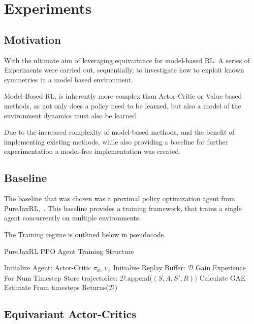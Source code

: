\chapter{Experiments}
\section{Motivation}
With the ultimate aim of leveraging equivariance for model-based RL. A series of Experiments were carried out, sequentially, to investigate how to exploit known symmetries in a model based environment.

Model-Based RL, is inherently more complex than Actor-Critic or Value based methods, as not only does a policy need to be learned, but also a model of the environment dynamics must also be learned.

Due to the increased complexity of model-based methods, and the benefit of implementing existing methods, while also providing a baseline for further experimentation a model-free implementation was created.

\section{Baseline}
The baseline that was chosen was a proximal policy optimization agent from PureJaxRL,~\cite{lu2022discovered}. This baseline provides a training framework, that trains a single agent concurrently on multiple environments.

The Training regime is outlined below in pseudocode.
\begin{algorithm}
	\caption{PureJaxRL PPO Agent Training Structure}
	\begin{algorithmic}
		\State Initialize Agent: Actor-Critic $\pi_\theta$, $v_\phi$
		\State Initialize Replay Buffer: $\mathcal{D}$
		\State Gain Experience For Num Timestep
		\State Store trajectories: $\mathcal{D}$.append($(S, A, S', R))$
		\State Calculate GAE Estimate From timesteps
		\EndFor
		\EndFor
		\State Returns($\mathcal{D}$)

	\end{algorithmic}
\end{algorithm}

\section{Equivariant Actor-Critics}
